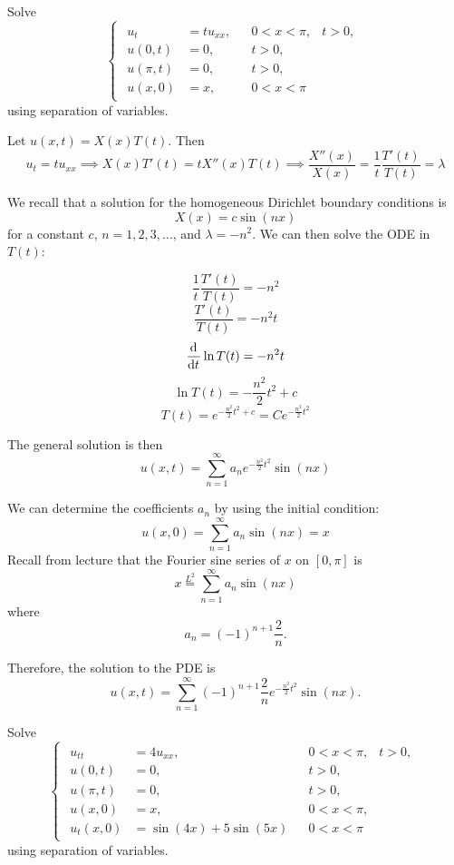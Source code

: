 \documentclass[plain]{pset}
\begin{document}
\pagebreak

\begin{problem}
Solve
\[
    \begin{cases}
        \begin{aligned}
            u_t       & = tu_{xx}, &  & 0 < x < \pi, & t > 0, \\
            u(0, t)   & = 0,       &  & t > 0,       &        \\
            u(\pi, t) & = 0,       &  & t > 0,       &        \\
            u(x, 0)   & = x,       &  & 0 < x < \pi
        \end{aligned}
    \end{cases}
\]
using separation of variables.
\end{problem}

\begin{solution}
    Let \(u(x, t) = X(x)T(t)\). Then
    \[u_t = tu_{xx} \implies X(x)T'(t) = tX''(x)T(t) \implies \frac{X''(x)}{X(x)} = \frac{1}{t}\frac{T'(t)}{T(t)} = \lambda\]

    We recall that a solution for the homogeneous Dirichlet boundary conditions is
    \[X(x) = c \sin(nx)\]
    for a constant \(c\), \(n = 1, 2, 3, \ldots\), and \(\lambda = -n^2\). We can then solve the ODE in \(T(t)\):

    \[\frac{1}{t}\frac{T'(t)}{T(t)} = -n^2\]
    \[\frac{T'(t)}{T(t)} = -n^2t\]
    \[\frac{\mathop{}\!\mathrm{d}^{} }{\mathop{}\!\mathrm{d} t^{}} \ln T(t) = -n^2t\]
    \[\ln T(t) = -\frac{n^2}{2}t^2 + c\]
    \[T(t) = e^{-\frac{n^2}{2}t^2 + c} = Ce^{-\frac{n^2}{2}t^2}\]

    The general solution is then
    \[u(x, t) = \sum_{n=1}^\infty a_n e^{-\frac{n^2}{2}t^2}\sin(nx)\]

    We can determine the coefficients \(a_n\) by using the initial condition:
    \[u(x, 0) = \sum_{n=1}^\infty a_n \sin(nx) = x\]
    Recall from lecture that the Fourier sine series of \(x\) on \([0, \pi]\) is
    \[x \stackrel{L^2}{=} \sum_{n=1}^\infty a_n \sin(nx)\]
    where
    \[a_n = (-1)^{n+1} \frac{2}{n}.\]

    Therefore, the solution to the PDE is
    \[u(x, t) = \sum_{n=1}^\infty (-1)^{n+1} \frac{2}{n} e^{-\frac{n^2}{2}t^2}\sin(nx).\]
\end{solution}

\pagebreak

\begin{problem}
Solve
\[
    \begin{cases}
        \begin{aligned}
            u_{tt}    & = 4u_{xx},             &  & 0 < x < \pi, & t > 0, \\
            u(0, t)   & = 0,                   &  & t > 0,       &        \\
            u(\pi, t) & = 0,                   &  & t > 0,       &        \\
            u(x, 0)   & = x,                   &  & 0 < x < \pi, &        \\
            u_t(x, 0) & = \sin(4x) + 5\sin(5x) &  & 0 < x < \pi
        \end{aligned}
    \end{cases}
\]
using separation of variables.
\end{problem}
\end{document}
